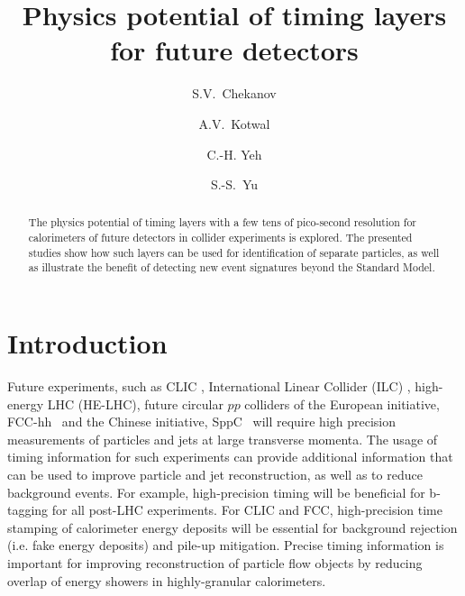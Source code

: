 \documentclass[final,1p,11pt]{elsarticle}
\begin{document}
\begin{frontmatter}

\title{
Physics potential of timing layers for future detectors}

\author[add1]{S.V.~Chekanov}

\author[addDuke]{A.V.~Kotwal}

\author[add3]{C.-H. Yeh}


\author[add3]{S.-S.~Yu}

\address[add1]{
HEP Division, Argonne National Laboratory,
9700 S.~Cass Avenue,
Argonne, IL 60439, USA.
}


\address[add3]{
Department of Physics and Center for High Energy and High Field Physics, 
National Central University, Chung-Li, Taoyuan City 32001, Taiwan
}

\address[addDuke]{
Department of Physics, Duke University, USA
}


\begin{abstract}
The physics potential of timing layers with a few tens of pico-second resolution for 
calorimeters of future detectors in collider experiments is explored.
The presented studies show how such layers can be used for identification 
of separate particles,  as well as illustrate the benefit of detecting  
new event signatures beyond  the Standard Model. 
\end{abstract}

\begin{keyword}

\end{keyword}
\end{frontmatter}



\section{Introduction}

Future experiments, such as CLIC \cite{Linssen:1425915}, International Linear Collider (ILC) \cite{Behnke:2013xla}, high-energy LHC (HE-LHC),
future circular $pp$ colliders of the European initiative, FCC-hh~\cite{Benedikt:2206376} and the Chinese initiative, SppC~\cite{Tang:2015qga} 
will require high precision measurements of particles and jets 
at large transverse momenta. 
The usage of timing information for such experiments  can  provide additional 
information that can be used to improve particle and jet reconstruction, as well as to reduce background events.
For example, high-precision timing will be beneficial for b-tagging for all post-LHC experiments. 
For CLIC and FCC, high-precision time stamping of calorimeter energy deposits will be essential for
background rejection (i.e. fake energy deposits) and pile-up mitigation.
Precise timing information is important for improving reconstruction of particle flow objects by reducing overlap 
of energy showers in highly-granular calorimeters.
\end{document}
